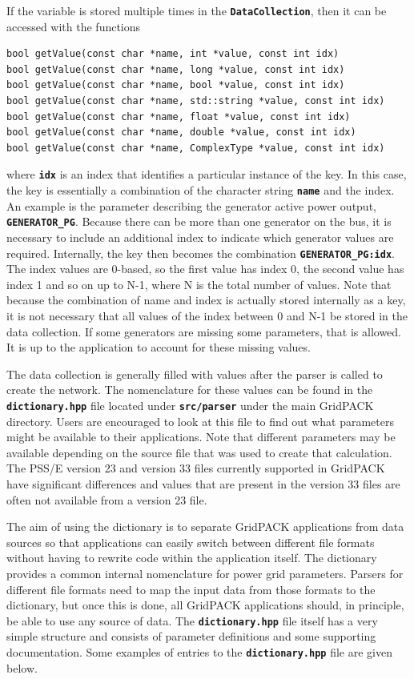 \documentclass[12pt]{report} %
\begin{document}
If the variable is stored multiple times in the \texttt{\textbf{DataCollection}}, then it can be accessed with the functions

{
\color{red}
\begin{Verbatim}[fontseries=b]
bool getValue(const char *name, int *value, const int idx)
bool getValue(const char *name, long *value, const int idx)
bool getValue(const char *name, bool *value, const int idx)
bool getValue(const char *name, std::string *value, const int idx)
bool getValue(const char *name, float *value, const int idx)
bool getValue(const char *name, double *value, const int idx)
bool getValue(const char *name, ComplexType *value, const int idx)
\end{Verbatim}
}

where \texttt{\textbf{idx}} is an index that identifies a particular instance of the key. In this case, the key is essentially a combination of the character string \texttt{\textbf{name}} and the index. An example is the parameter describing the generator active power output, \texttt{\textbf{GENERATOR\_PG}}. Because there can be more than one generator on the bus, it is necessary to include an additional index to indicate which generator values are required. Internally, the key then becomes the combination \texttt{\textbf{GENERATOR\_PG:idx}}. The index values are 0-based, so the first value has index 0, the second value has index 1 and so on up to N-1, where N is the total number of values. Note that because the combination of name and index is actually stored internally as a key, it is not necessary that all values of the index between 0 and N-1 be stored in the data collection. If some generators are missing some parameters, that is allowed. It is up to the application to account for these missing values.

The data collection is generally filled with values after the parser is called to create the network. The nomenclature for these values can be found in the \texttt{\textbf{dictionary.hpp}} file located under \texttt{\textbf{src/parser}} under the main GridPACK directory. Users are encouraged to look at this file to find out what parameters might be available to their applications. Note that different parameters may be available depending on the source file that was used to create that calculation. The PSS/E version 23 and version 33 files currently supported in GridPACK have significant differences and values that are present in the version 33 files are often not available from a version 23 file.

The aim of using the dictionary is to separate GridPACK applications from data sources so that applications can easily switch between different file formats without having to rewrite code within the application itself. The dictionary provides a common internal nomenclature for power grid parameters. Parsers for different file formats need to map the input data from those formats to the dictionary, but once this is done, all GridPACK applications should, in principle, be able to use any source of data.
The \texttt{\textbf{dictionary.hpp}} file itself has a very simple structure and consists of parameter definitions and some supporting documentation. Some examples of entries to the \texttt{\textbf{dictionary.hpp}} file are given below.
\end{document}
